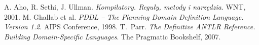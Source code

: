 
\begin{thebibliography}{1}


A. Aho, R. Sethi, J. Ullman. \emph{Kompilatory. Reguły, metody i narzędzia}.
WNT, 2001.
M. Ghallab et al. \emph{PDDL -- The Planning Domain Definition Language. Version 1.2}.
AIPS Conference, 1998.
T.~Parr. \emph{The Definitive ANTLR Reference. Building Domain-Specific Languages}. 
The Pragmatic Bookshelf, 2007.


\end{thebibliography}
